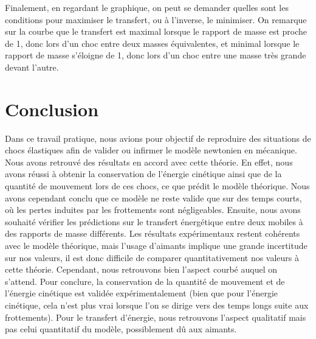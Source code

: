 \documentclass[12pt]{article}
\begin{document}
Finalement, en regardant le graphique, on peut se demander quelles sont les conditions pour maximiser le transfert, ou à l'inverse, le minimiser. On remarque sur la courbe que le transfert est maximal lorsque
le rapport de masse est proche de 1, donc lors d'un choc entre deux masses équivalentes, et minimal lorsque le rapport de masse s'éloigne de 1, donc lors d'un choc entre une masse très grande devant l'autre.

\section*{Conclusion}

Dans ce travail pratique, nous avions pour objectif de reproduire des situations de chocs élastiques afin de valider ou infirmer le modèle newtonien en mécanique. Nous avons retrouvé
des résultats en accord avec cette théorie. En effet, nous avons réussi à obtenir la conservation de l'énergie cinétique ainsi que de la quantité de mouvement lors de ces chocs, ce que 
prédit le modèle théorique. Nous avons cependant conclu que ce modèle ne reste valide que sur des temps courts, où les pertes induites par les frottements sont négligeables. Ensuite,
nous avons souhaité vérifier les prédictions sur le transfert énergétique entre deux mobiles à des rapports de masse différents. Les résultats expérimentaux restent cohérents avec 
le modèle théorique, mais l'usage d'aimants implique une grande incertitude sur nos valeurs, il est donc difficile de comparer quantitativement nos valeurs à cette théorie. Cependant, 
nous retrouvons bien l'aspect courbé auquel on s'attend. Pour conclure, la conservation de la quantité de mouvement et de l'énergie cinétique est validée expérimentalement (bien que 
pour l'énergie cinétique, cela n'est plus vrai lorsque l'on se dirige vers des temps longs suite aux frottements). Pour le transfert d'énergie, nous retrouvons l'aspect qualitatif mais
pas celui quantitatif du modèle, possiblement dû aux aimants.


\newpage
\end{document}
